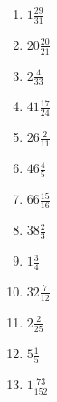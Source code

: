 \documentclass[12pt]{article}
\begin{document}
\begin{enumerate}
\item $ 1 \frac{29}{31} $
\item $ 20 \frac{20}{21} $
\item $ 2 \frac{4}{33} $
\item $ 41 \frac{17}{24} $
\item $ 26 \frac{2}{11} $
\item $ 46 \frac{4}{5} $
\item $ 66 \frac{15}{16} $
\item $ 38 \frac{2}{3} $
\item $ 1 \frac{3}{4} $
\item $ 32 \frac{7}{12} $
\item $ 2 \frac{2}{25} $
\item $ 5 \frac{1}{5} $
\item $ 1 \frac{73}{152} $
\end{enumerate}
\newpage
\end{document}
